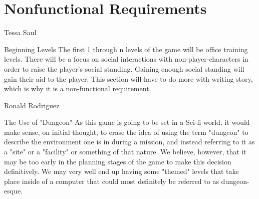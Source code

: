 \documentclass[12pt]{report}
\begin{document}
\chapter{Nonfunctional Requirements}
\begin{section}{Tessa Saul}
\begin{subsection}{Beginning Levels}
The first 1 through n levels of the game will be office training levels. There will be a focus on social interactions with non-player-characters in order to raise the player's social standing. Gaining enough social standing will gain their aid to the player. This section will have to do more with writing story, which is why it is a non-functional requirement. 
\end{subsection} 
\end{section}


\begin{section}{Ronald Rodriguez}
\begin{subsection}{The Use of "Dungeon"}
As this game is going to be set in a Sci-fi world, it would make sense, on 
initial thought, to erase the idea of using the term "dungeon" to describe 
the environment one is in during a mission, and instead referring to it as 
a "site" or a "facility" or something of that nature. We believe, however, 
that it may be too early in the planning stages of the game to make this 
decision definitively. We may very well end up having some "themed" levels 
that take place inside of a computer that could most definitely be referred 
to as dungeon-esque. 
\end{subsection}
\end{section}
\end{document}
